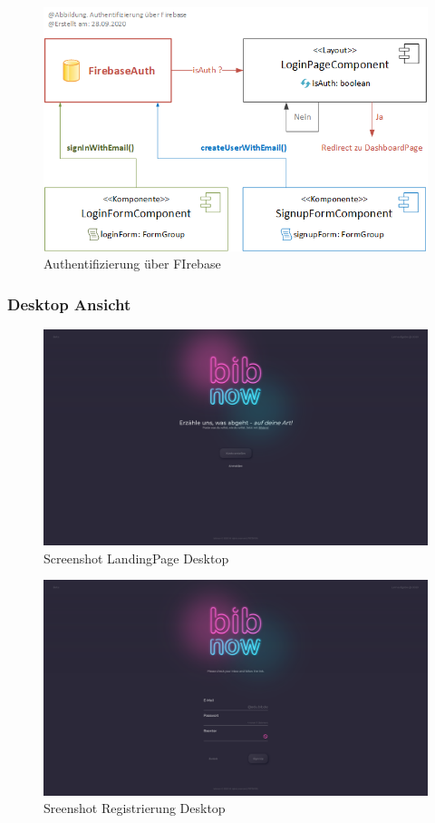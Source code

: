 \documentclass[12pt,titlepage]{article}
\begin{document}
\begin{figure}[hbt!]
\centering
\includegraphics[width=400pt]{abbildungen/Abbildung_Authentifizierung_LoginPage.png}
\caption{Authentifizierung über FIrebase}
\end{figure}

\FloatBarrier
\newpage
\subsubsection{Desktop Ansicht}

\begin{figure}[hbt!]
\centering
\includegraphics[width=400pt]{screenshots/Screenshot_Desktop1.png}
\caption{Screenshot LandingPage Desktop}
\end{figure}

\begin{figure}[hbt!]
\centering
\includegraphics[width=400pt]{screenshots/Screenshot_Desktop2.png}
\caption{Sreenshot Registrierung Desktop}
\end{figure}
\end{document}

